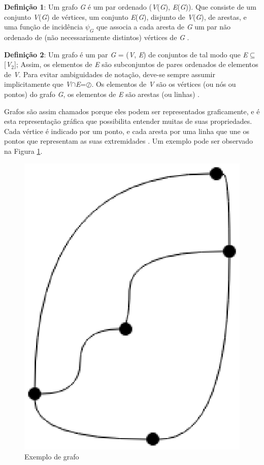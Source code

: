 \textbf{Definição 1}: Um grafo \textit{G} é um par ordenado (\textit{V}(\textit{G}), \textit{E}(\textit{G})). Que consiste de um conjunto \textit{V}(\textit{G}) de vértices, um conjunto \textit{E}(\textit{G}), disjunto de \textit{V}(\textit{G}), de arestas, e uma função de incidência $\psi_G$ que associa a cada aresta de \textit{G} um par não ordenado de (não necessariamente distintos) vértices de \textit{G} \cite{Bondy:2007}.

\textbf{Definição 2}: Um grafo é um par \textit{G} = (\textit{V}, \textit{E}) de conjuntos de tal modo que \textit{E}$\subseteq$[\textit{V}$_2$]; Assim, os elementos de \textit{E} são subconjuntos de pares ordenados de elementos de \textit{V}. Para evitar ambiguidades de notação, deve-se sempre assumir implicitamente que \textit{V}$\cap$\textit{E}=$\oslash$. Os elementos de \textit{V} são os vértices (ou nós ou pontos) do grafo \textit{G}, os elementos de \textit{E} são arestas (ou linhas) \cite{Diestel:1997}.

Grafos são assim chamados porque eles podem ser representados graficamente, e é esta representação gráfica que possibilita entender muitas de suas propriedades. Cada vértice é indicado por um ponto, e cada aresta por uma linha que une os pontos que representam as suas extremidades \cite{Bondy:2007}. Um exemplo pode ser observado na Figura \ref{exemplo_grafo}.

\begin{figure}[!h]
	\centering
	\includegraphics[scale=0.3]{figuras/capitulo2/exemplo_grafo.eps}
	\caption{Exemplo de grafo}
	\label{exemplo_grafo}
\end{figure}

